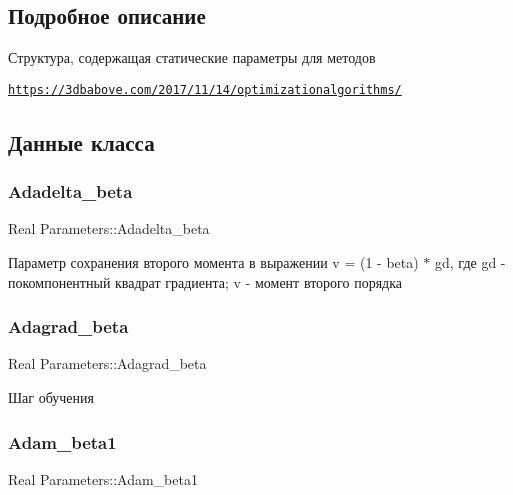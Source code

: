 \subsection{Подробное описание}
Структура, содержащая статические параметры для методов 

\href{https://3dbabove.com/2017/11/14/optimizationalgorithms/}{\tt https\+://3dbabove.\+com/2017/11/14/optimizationalgorithms/} 

\subsection{Данные класса}
\mbox{\label{structParameters_a214aefe35044cc9c7782cb9b33dfee2c}} 
\subsubsection{\texorpdfstring{Adadelta\+\_\+beta}{Adadelta\_beta}}
{\footnotesize\ttfamily Real Parameters\+::\+Adadelta\+\_\+beta\hspace{0.3cm}{\ttfamily [static]}}

Параметр сохранения второго момента в выражении v = (1 -\/ beta) $\ast$ gd, где gd -\/ покомпонентный квадрат градиента; v -\/ момент второго порядка \mbox{\label{structParameters_a9fc2748adaa357bf6e4ad14bcd86ade9}} 
\subsubsection{\texorpdfstring{Adagrad\+\_\+beta}{Adagrad\_beta}}
{\footnotesize\ttfamily Real Parameters\+::\+Adagrad\+\_\+beta\hspace{0.3cm}{\ttfamily [static]}}

Шаг обучения \mbox{\label{structParameters_a8c6cd65deec4169ae0cdefffcb8e2252}} 
\subsubsection{\texorpdfstring{Adam\+\_\+beta1}{Adam\_beta1}}
{\footnotesize\ttfamily Real Parameters\+::\+Adam\+\_\+beta1\hspace{0.3cm}{\ttfamily [static]}}

